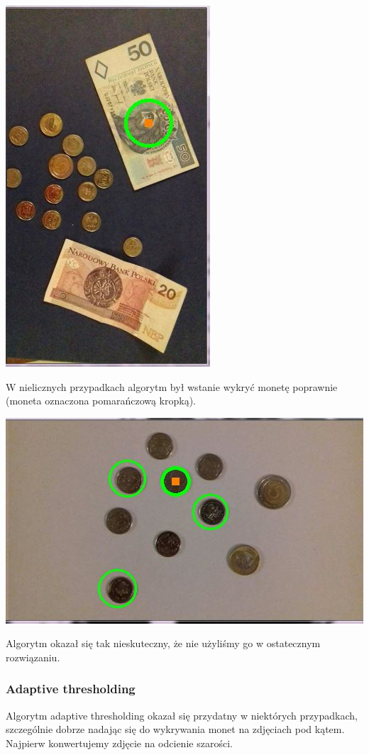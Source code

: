 \documentclass[12pt]{article}
\begin{document}
\includegraphics[scale=0.4]{momentyHougha}

W nielicznych przypadkach algorytm był wstanie wykryć monetę poprawnie (moneta oznaczona pomarańczową kropką).

\includegraphics[scale=0.5]{momentyHoughaOK}

Algorytm okazał się tak nieskuteczny, że nie użyliśmy go w ostatecznym rozwiązaniu.
\newpage
\subsubsection*{Adaptive thresholding}
Algorytm adaptive thresholding okazał się przydatny w niektórych przypadkach, szczególnie dobrze nadając się do wykrywania monet na zdjęciach pod kątem.
Najpierw konwertujemy zdjęcie na odcienie szarości.
\end{document}
